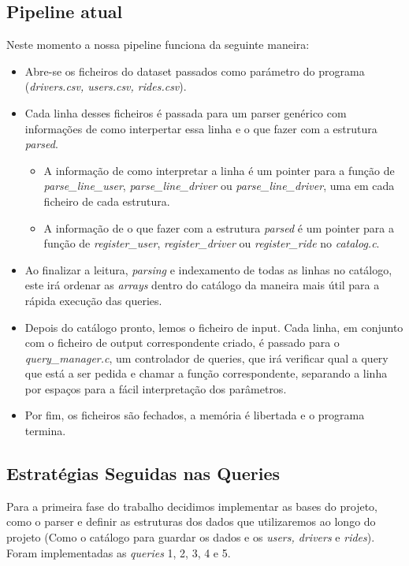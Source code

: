 \documentclass{article}
\begin{document}
        \subsection{Pipeline atual}
            Neste momento a nossa pipeline funciona da seguinte maneira: 
            \begin{itemize}
                \item Abre-se os ficheiros do dataset passados como parámetro do 
                programa (\emph{drivers.csv, users.csv, rides.csv}).
                \item Cada linha desses ficheiros é passada para um parser genérico
                com informações de como interpertar essa linha e o que fazer com
                a estrutura \emph{parsed}.
                \begin{itemize}
                    \item A informação de como interpretar a linha é um pointer para
                    a função de \emph{parse\_line\_user}, \emph{parse\_line\_driver} ou \emph{parse\_line\_driver},
                    uma em cada ficheiro de cada estrutura.
                    \item A informação de o que fazer com a estrutura \emph{parsed} é um pointer para
                    a função de \emph{register\_user}, \emph{register\_driver} ou \emph{register\_ride}
                    no \emph{catalog.c}.
                \end{itemize}
                \item Ao finalizar a leitura, \emph{parsing} e indexamento de
                todas as linhas no catálogo, este irá ordenar as \emph{arrays} 
                dentro do catálogo da maneira mais útil para a rápida execução das 
                queries.
                \item Depois do catálogo pronto, lemos o ficheiro de input.
                Cada linha, em conjunto com o ficheiro de output correspondente criado,
                é passado para o \emph{query\_manager.c}, um controlador
                de queries, que irá verificar qual a query que está a ser pedida
                e chamar a função correspondente, separando a linha por espaços
                para a fácil interpretação dos parâmetros.
                \item Por fim, os ficheiros são fechados, a memória é libertada 
                e o programa termina.
            \end{itemize}
        \subsection{Estratégias Seguidas nas Queries}
            Para a primeira fase do trabalho decidimos implementar as bases do 
            projeto, como o parser e definir as estruturas dos dados que 
            utilizaremos ao longo do projeto (Como o catálogo para guardar os 
            dados e os \emph{users, drivers} e \emph{rides}). Foram 
            implementadas as \emph{queries} 1, 2, 3, 4 e 5. 
            
\end{document}
